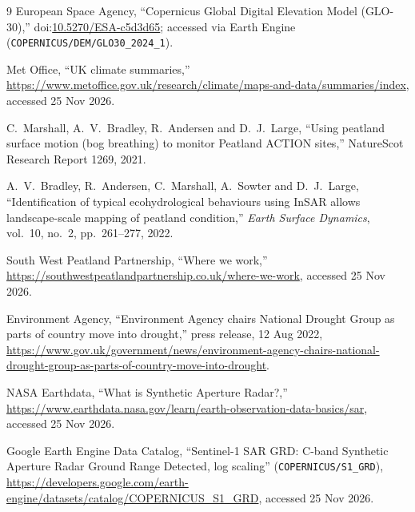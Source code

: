 \documentclass[10pt,a4paper,twocolumn]{article}
\begin{document}
\begin{thebibliography}{9}
  European Space Agency, ``Copernicus Global Digital Elevation Model
  (GLO-30),'' doi:\href{https://doi.org/10.5270/ESA-c5d3d65}{10.5270/ESA-c5d3d65};
  accessed via Earth Engine (\texttt{COPERNICUS/DEM/GLO30\_2024\_1}).

  Met Office, ``UK climate summaries,''
  \url{https://www.metoffice.gov.uk/research/climate/maps-and-data/summaries/index},
  accessed 25 Nov 2026.

  C.~Marshall, A.~V.~Bradley, R.~Andersen and D.~J.~Large, ``Using peatland
  surface motion (bog breathing) to monitor Peatland ACTION sites,''
  NatureScot Research Report 1269, 2021.

  A.~V.~Bradley, R.~Andersen, C.~Marshall, A.~Sowter and D.~J.~Large,
  ``Identification of typical ecohydrological behaviours using InSAR allows
  landscape-scale mapping of peatland condition,'' \emph{Earth Surface
  Dynamics}, vol.~10, no.~2, pp.~261--277, 2022.

  South West Peatland Partnership, ``Where we work,''
  \url{https://southwestpeatlandpartnership.co.uk/where-we-work}, accessed
  25 Nov 2026.

  Environment Agency, ``Environment Agency chairs National Drought Group as
  parts of country move into drought,'' press release, 12 Aug 2022,
  \url{https://www.gov.uk/government/news/environment-agency-chairs-national-drought-group-as-parts-of-country-move-into-drought}.

  NASA Earthdata, ``What is Synthetic Aperture Radar?,''
  \url{https://www.earthdata.nasa.gov/learn/earth-observation-data-basics/sar},
  accessed 25 Nov 2026.

  Google Earth Engine Data Catalog, ``Sentinel-1 SAR GRD: C-band Synthetic
  Aperture Radar Ground Range Detected, log scaling'' (\texttt{COPERNICUS/S1\_GRD}),
  \url{https://developers.google.com/earth-engine/datasets/catalog/COPERNICUS_S1_GRD},
  accessed 25 Nov 2026.

\end{thebibliography}
\endgroup
\end{document}
